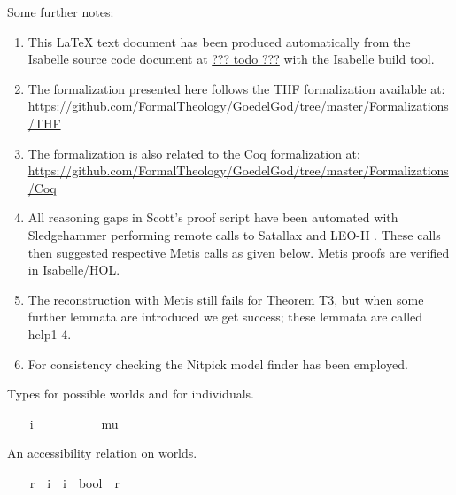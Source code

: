 \begin{isabellebody}
\begin{isamarkuptext}
 Some further notes:
 \begin{enumerate}
 \item This LaTeX text document has been produced automatically from the Isabelle source
 code document at \url{??? todo ???} with the Isabelle build tool.
 \item The formalization presented here follows the THF \cite{J22} formalization available at: 
    \url{https://github.com/FormalTheology/GoedelGod/tree/master/Formalizations/THF}
 \item The formalization is also related to the Coq \cite{Coq} formalization at:  
    \url{https://github.com/FormalTheology/GoedelGod/tree/master/Formalizations/Coq}
 \item All reasoning gaps in Scott's proof script have been automated 
    with Sledgehammer \cite{Sledgehammer} performing remote calls to Satallax 
    \cite{Satallax} and LEO-II \cite{LEO-II}. These calls then suggested respective 
    Metis \cite{Metis} calls as given below. Metis proofs are verified in Isabelle/HOL.
 \item The reconstruction with Metis still fails for Theorem T3, but when some further
    lemmata are introduced we get success; these lemmata are called help1-4.
 \item For consistency checking the Nitpick model finder \cite{Nitpick} has been employed.
 \end{enumerate}%
\end{isamarkuptext}%
\isamarkuptrue%
%
\isamarkuptrue%
%
\begin{isamarkuptext}%
Types for possible worlds and for individuals.%
\end{isamarkuptext}%
\isamarkuptrue%
\ \ \isamarkupfalse%
\ i\ \ \ \ \ %
\ \isanewline
\ \ \isamarkupfalse%
\ mu\ \ \ \ %
%
\begin{isamarkuptext}%
An accessibility relation on worlds.%
\end{isamarkuptext}%
\isamarkuptrue%
\ \ \isamarkupfalse%
\ r\ {\isacharcolon}{\isacharcolon}\ {\isachardoublequoteopen}i\ {\isasymRightarrow}\ i\ {\isasymRightarrow}\ bool{\isachardoublequoteclose}\ {\isacharparenleft}\ {\isachardoublequoteopen}r{\isachardoublequoteclose}\ {}{}{\isacharparenright}\ \ \ \ %
%
\begin{isamarkuptext}%

\end{isamarkuptext}
\end{isabellebody}

